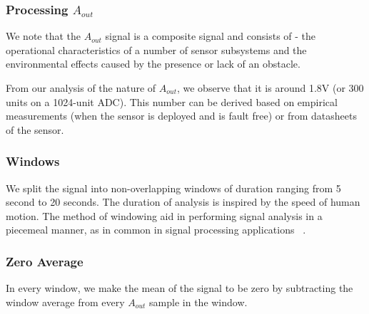 \subsubsection{Processing $A_{out}$} We note that the $A_{out}$ signal is a composite signal and consists of - \ca the operational characteristics of a number of sensor subsystems  and \cb the environmental effects caused by the presence or lack of an obstacle.

From our analysis of the nature of $A_{out}$, we observe that it is around 1.8V (or 300 units on a 1024-unit ADC). This number can be derived based on empirical measurements (\ie when the sensor is deployed and is fault free) or from datasheets of the sensor. 

\subsubsection{Windows} We split the signal into non-overlapping windows of duration ranging from 5 second to 20 seconds. The duration of analysis is inspired by the speed of human motion. The method of windowing aid in performing signal analysis in a piecemeal manner, as in common in signal processing applications ~\cite{}.

\subsubsection{Zero Average} In every window, we make the mean of the signal to be zero by subtracting the window average from every $A_{out}$ sample in the window.